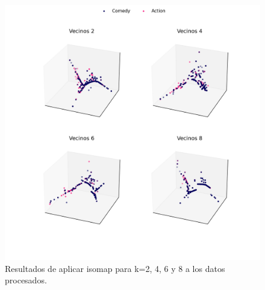 \begin{figure}[H]
    \centering
    \includegraphics[width=16cm]{Graphics/Problema_3_2/isomap.png}
    \caption{Resultados de aplicar isomap para k=2, 4, 6 y 8 a los datos procesados.}
    \label{fig:problema06_isomap}
\end{figure}